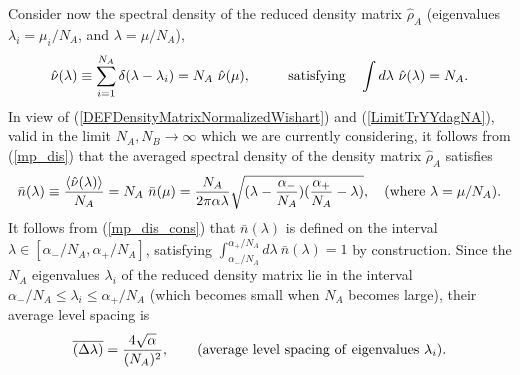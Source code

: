 \documentclass[aps,prb,preprint,onecolumn,amsmath,amssymb,superscriptaddress,eqsecnum,floatfix,scrartcl]{revtex4-1}
\begin{document}
Consider now the spectral density 
of the reduced density matrix ${\hat \rho}_A$ (eigenvalues $\lambda_i=\mu_i/N_A$,
and $\lambda = \mu/N_A$),
\begin{eqnarray}
\label{DEFDensityOfStates}
{\hat \nu}(\lambda) \equiv \sum_{i=1}^{N_A} \delta(\lambda-\lambda_i) = N_A  \ {\hat \nu}(\mu),
\qquad \ \  {\rm satisfying} \quad \int d \lambda \  {\hat \nu}(\lambda) = N_A.
\end{eqnarray}
In view of (\ref{DEFDensityMatrixNormalizedWishart})   and (\ref{LimitTrYYdagNA}),
valid
in the limit $N_A,N_B \to \infty$ which we are currently considering, it follows from 
(\ref{mp_dis}) that the averaged spectral density 
of the   density matrix ${\hat  \rho}_A$ satisfies
\begin{align}
\bar{n}(\lambda)
\equiv
{\langle{\hat \nu}(\lambda)\rangle \over N_A}
=
N_A \ \bar{n}(\mu)=  
\frac{N_A}{2\pi\alpha \lambda}\sqrt{(\lambda-\frac{\alpha_-}{N_A})(\frac{\alpha_+}{N_A}-\lambda)},
\ \  \  ({\rm where} \ \lambda=\mu/N_A).
\label{mp_dis_cons}
\end{align}
It follows from
(\ref{mp_dis_cons})
 that
$\bar{n}(\lambda)$ is defined on the interval  $\lambda \in [\alpha_-/N_A,\alpha_+/N_A]$, satisfying  
$\int_{\scriptscriptstyle \alpha_-/N_A}^{\scriptscriptstyle \alpha_+/N_A} d\lambda \ 
\bar{n}(\lambda)=1$
by construction.
Since the $N_A$ eigenvalues $\lambda_i$ of the reduced density matrix lie in the interval
$\alpha_-/N_A \leq \lambda_i \leq \alpha_+/N_A$ (which becomes small when $N_A$ becomes large),  their average
level spacing is
\begin{eqnarray}
\label{AverageLevelSpacingLambdai}
\overline{\left (\Delta \lambda\right )} 
=
{4 \sqrt{\alpha}
\over (N_A)^2},
\qquad ({\rm average \ level \ spacing \ of \ eigenvalues} \ \lambda_i).
\end{eqnarray}
\end{document}
